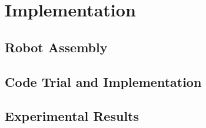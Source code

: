 \chapter{Implementation}
\label{ch: Chapter5}

\section{Robot Assembly}



\section{Code Trial and Implementation}



\section{Experimental Results}


